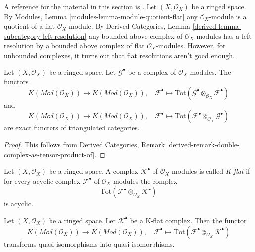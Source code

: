 \noindent
A reference for the material in this section is \cite{Spaltenstein}.
Let $(X, \mathcal{O}_X)$ be a ringed space. By
Modules, Lemma \ref{modules-lemma-module-quotient-flat}
any $\mathcal{O}_X$-module is a quotient of a flat $\mathcal{O}_X$-module.
By
Derived Categories, Lemma \ref{derived-lemma-subcategory-left-resolution}
any bounded above complex of $\mathcal{O}_X$-modules has a left
resolution by a bounded above complex of flat $\mathcal{O}_X$-modules.
However, for unbounded complexes, it turns out that flat resolutions
aren't good enough.

\begin{lemma}
\label{lemma-derived-tor-exact}
Let $(X, \mathcal{O}_X)$ be a ringed space.
Let $\mathcal{G}^\bullet$ be a complex of $\mathcal{O}_X$-modules.
The functors
$$
K(\textit{Mod}(\mathcal{O}_X))
\longrightarrow
K(\textit{Mod}(\mathcal{O}_X)),
\quad
\mathcal{F}^\bullet \longmapsto
\text{Tot}(\mathcal{G}^\bullet \otimes_{\mathcal{O}_X} \mathcal{F}^\bullet)
$$
and
$$
K(\textit{Mod}(\mathcal{O}_X))
\longrightarrow
K(\textit{Mod}(\mathcal{O}_X)),
\quad
\mathcal{F}^\bullet \longmapsto
\text{Tot}(\mathcal{F}^\bullet \otimes_{\mathcal{O}_X} \mathcal{G}^\bullet)
$$
are exact functors of triangulated categories.
\end{lemma}

\begin{proof}
This follows from Derived Categories, Remark
\ref{derived-remark-double-complex-as-tensor-product-of}.
\end{proof}

\begin{definition}
\label{definition-K-flat}
Let $(X, \mathcal{O}_X)$ be a ringed space.
A complex $\mathcal{K}^\bullet$ of $\mathcal{O}_X$-modules is
called {\it K-flat} if for every acyclic complex $\mathcal{F}^\bullet$
of $\mathcal{O}_X$-modules the complex
$$
\text{Tot}(\mathcal{F}^\bullet \otimes_{\mathcal{O}_X} \mathcal{K}^\bullet)
$$
is acyclic.
\end{definition}

\begin{lemma}
\label{lemma-K-flat-quasi-isomorphism}
Let $(X, \mathcal{O}_X)$ be a ringed space.
Let $\mathcal{K}^\bullet$ be a K-flat complex.
Then the functor
$$
K(\textit{Mod}(\mathcal{O}_X))
\longrightarrow
K(\textit{Mod}(\mathcal{O}_X)), \quad
\mathcal{F}^\bullet
\longmapsto
\text{Tot}(\mathcal{F}^\bullet \otimes_{\mathcal{O}_X} \mathcal{K}^\bullet)
$$
transforms quasi-isomorphisms into quasi-isomorphisms.
\end{lemma}

